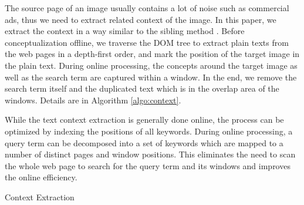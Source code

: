 The source page of an image usually contains a lot of noise such as
commercial ads, thus we need to extract related context of the image.
In this paper, we extract the context in a way similar to the sibling method
\cite{Alcic2010}.
Before conceptualization offline, we traverse the DOM tree to extract plain
texts from the web pages in a depth-first order,
and mark the position of the target image in the plain text.
During online processing, the concepts around the target image as well as
the search term are captured within a window.
In the end, we remove the search term itself and the duplicated text
which is in the overlap area of the windows.
Details are in Algorithm \ref{algo:context}.

While the text context extraction is generally done online,
the process can be optimized by indexing the positions of all
keywords. During online processing, a query term can be
decomposed into a set of keywords which are mapped to a number of
distinct pages and window positions. This eliminates the need
to scan the whole web page to search for the query term and
its windows and improves the online efficiency.


\renewcommand\algorithmicrequire{\textbf{Input:}}
\renewcommand\algorithmicensure {\textbf{Output:}}
\begin{algorithm}[th]
\caption{Context Extraction}
\label{algo:context}
\begin{algorithmic}[1]
\EndFor
{}
\EndFunction
\Statex
{}
\EndFor
{}
\EndFunction
\end{algorithmic}
\end{algorithm}

